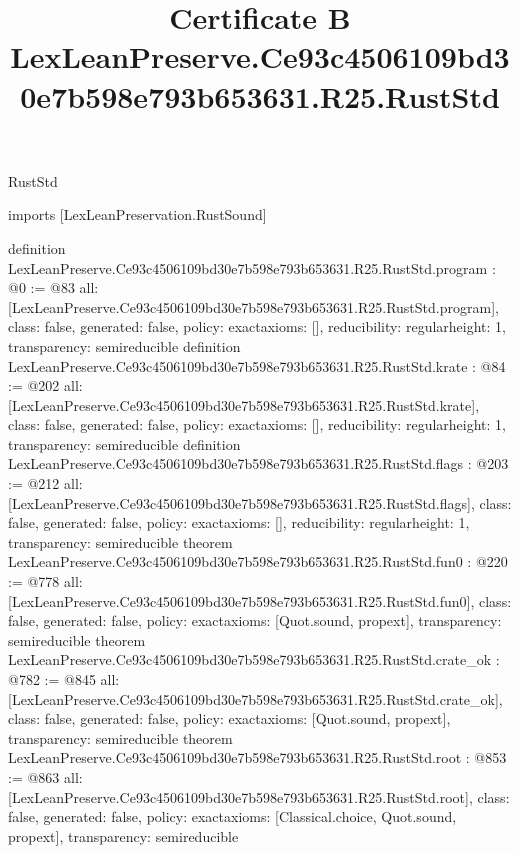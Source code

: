 \begin{lexlean}{RustStd}
\title{Certificate B LexLeanPreserve.Ce93c4506109bd30e7b598e793b653631.R25.RustStd}
\begin{coremodule}
imports [LexLeanPreservation.RustSound]

definition LexLeanPreserve.Ce93c4506109bd30e7b598e793b653631.R25.RustStd.program : @0 := @83 {
  all: [LexLeanPreserve.Ce93c4506109bd30e7b598e793b653631.R25.RustStd.program],
  class: false,
  generated: false,
  policy: exact{axioms: []},
  reducibility: regular{height: 1},
  transparency: semireducible
}
definition LexLeanPreserve.Ce93c4506109bd30e7b598e793b653631.R25.RustStd.krate : @84 := @202 {
  all: [LexLeanPreserve.Ce93c4506109bd30e7b598e793b653631.R25.RustStd.krate],
  class: false,
  generated: false,
  policy: exact{axioms: []},
  reducibility: regular{height: 1},
  transparency: semireducible
}
definition LexLeanPreserve.Ce93c4506109bd30e7b598e793b653631.R25.RustStd.flags : @203 := @212 {
  all: [LexLeanPreserve.Ce93c4506109bd30e7b598e793b653631.R25.RustStd.flags],
  class: false,
  generated: false,
  policy: exact{axioms: []},
  reducibility: regular{height: 1},
  transparency: semireducible
}
theorem LexLeanPreserve.Ce93c4506109bd30e7b598e793b653631.R25.RustStd.fun0 : @220 := @778 {
  all: [LexLeanPreserve.Ce93c4506109bd30e7b598e793b653631.R25.RustStd.fun0],
  class: false,
  generated: false,
  policy: exact{axioms: [Quot.sound, propext]},
  transparency: semireducible
}
theorem LexLeanPreserve.Ce93c4506109bd30e7b598e793b653631.R25.RustStd.crate_ok : @782 := @845 {
  all: [LexLeanPreserve.Ce93c4506109bd30e7b598e793b653631.R25.RustStd.crate_ok],
  class: false,
  generated: false,
  policy: exact{axioms: [Quot.sound, propext]},
  transparency: semireducible
}
theorem LexLeanPreserve.Ce93c4506109bd30e7b598e793b653631.R25.RustStd.root : @853 := @863 {
  all: [LexLeanPreserve.Ce93c4506109bd30e7b598e793b653631.R25.RustStd.root],
  class: false,
  generated: false,
  policy: exact{axioms: [Classical.choice, Quot.sound, propext]},
  transparency: semireducible
}


\end{coremodule}
\end{lexlean}
